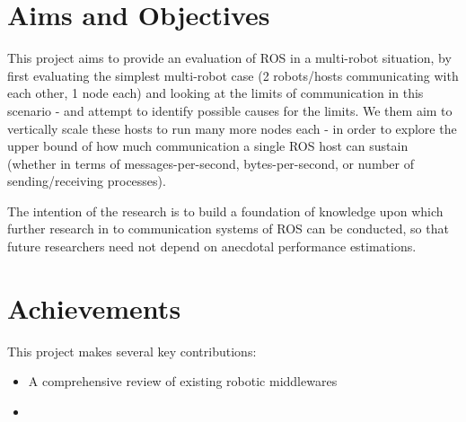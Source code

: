 \documentclass[../dissertation.tex]{subfiles}
\begin{document}
\section{Aims and Objectives}

This project aims to provide an evaluation of ROS in a multi-robot situation, by first evaluating the simplest multi-robot case (2 robots/hosts communicating with each other, 1 node each) and looking at the limits of communication in this scenario - and attempt to identify possible causes for the limits. We them aim to vertically scale these hosts to run many more nodes each - in order to explore the upper bound of how much communication a single ROS host can sustain (whether in terms of messages-per-second, bytes-per-second, or number of sending/receiving processes).

The intention of the research is to build a foundation of knowledge upon which further research in to communication systems of ROS can be conducted, so that future researchers need not depend on anecdotal performance estimations.

\section{Achievements}

This project makes several key contributions:

\begin{itemize}
  \item A comprehensive review of existing robotic middlewares
  \item 
\end{itemize}
\end{document}
